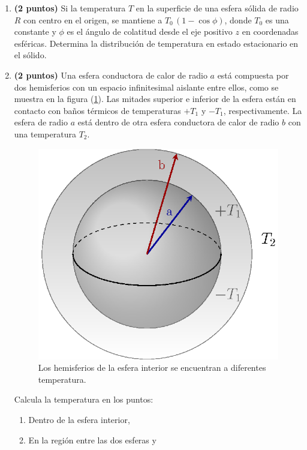 \begin{enumerate}
\item \textbf{(2 puntos) } Si la temperatura $T$ en la superficie de una esfera sólida de radio $R$ con centro en el origen, se mantiene a $T_{0} \, (1 - \cos \phi)$, donde $T_{0}$ es una constante y $\phi$ es el ángulo de colatitud desde el eje positivo $z$ en coordenadas esféricas. Determina la distribución de temperatura en estado estacionario en el sólido.
\item \textbf{(2 puntos) } Una esfera conductora de calor de radio $a$ está compuesta por dos hemisferios con un espacio infinitesimal aislante entre ellos, como se muestra en la figura (\ref{fig:figura2}). Las mitades superior e inferior de la esfera están en contacto con baños térmicos de temperaturas $+ T_{1}$ y $-T_{1}$, respectivamente. La esfera de radio $a$ está dentro de otra esfera conductora de calor de radio $b$ con una temperatura $T_{2}$.
\begin{figure}[H]
    \centering
   \includegraphics[scale=0.8]{Imagenes/esfera1.eps}
    \caption{Los hemisferios de la esfera interior se encuentran a diferentes temperatura.}
    \label{fig:figura2}
\end{figure}
Calcula la temperatura en los puntos:
\begin{enumerate}
\item Dentro de la esfera interior,
\item En la región entre las dos esferas y

\end{enumerate}
\end{enumerate}
